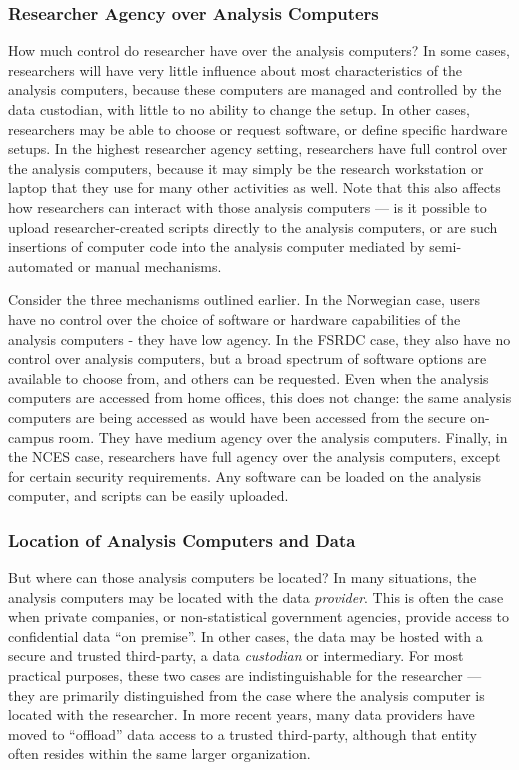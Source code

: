 \subsubsection{Researcher Agency over Analysis Computers}

How much control do researcher have over the analysis computers? In some cases, researchers will have very little influence about most characteristics of the analysis computers, because these computers are managed and controlled by the data custodian, with little to no ability to change the setup. In other cases, researchers may be able to choose or request software, or define specific hardware setups. In the highest researcher agency setting, researchers have full control over the analysis computers, because it may simply be the research workstation or laptop that they use for many other activities as well. Note that this also affects how researchers can interact with those analysis computers --- is it possible to upload researcher-created scripts directly to the analysis computers, or are such insertions of computer code into the analysis computer mediated by semi-automated or manual mechanisms. 

Consider the three mechanisms outlined earlier. In the Norwegian case, users have no control over the choice of software or hardware capabilities of the analysis computers - they have low agency. In the FSRDC case, they also have no control over analysis computers, but a broad spectrum of software options are available to choose from, and others can be requested. Even when the analysis computers are accessed from home offices, this does not change: the same analysis computers are being accessed as would have been accessed from the secure on-campus room. They have medium agency over the analysis computers. Finally, in the NCES case, researchers have full agency over the analysis computers, except for certain security requirements. Any software can be loaded on the analysis computer, and scripts can be easily uploaded.

\subsubsection{Location of Analysis Computers and Data}

But where can those analysis computers be located? In many situations, the analysis computers may be located with the data \textit{provider}. This is often the case when private companies, or non-statistical government agencies, provide access to confidential data ``on premise''. In other cases, the data may be hosted with a secure and trusted third-party, a data \textit{custodian} or intermediary. For most practical purposes, these two cases are indistinguishable for the researcher --- they are primarily distinguished from the case where the analysis computer is located with the researcher. In more recent years, many data providers have moved to ``offload'' data access to a trusted third-party, although that entity often resides within the same larger organization. 

